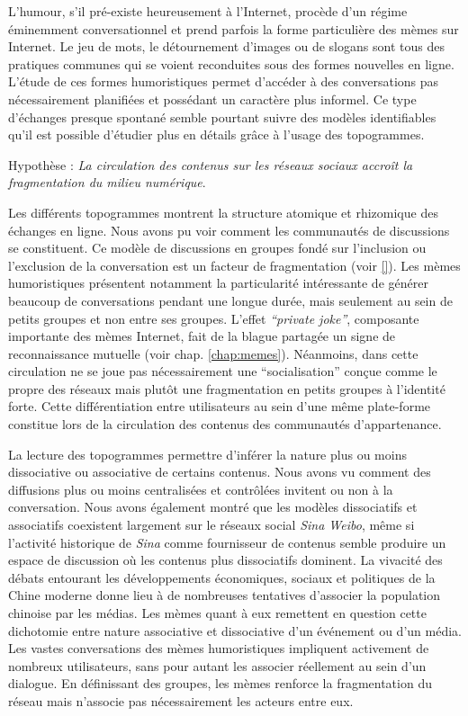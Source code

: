L'humour, s'il pré-existe heureusement à l'Internet, procède d'un régime éminemment conversationnel et prend parfois la forme particulière des mèmes sur Internet. Le jeu de mots, le détournement d'images ou de slogans sont tous des pratiques communes qui se voient reconduites sous des formes nouvelles en ligne. L'étude de ces formes humoristiques permet d'accéder à des conversations pas nécessairement planifiées et possédant un caractère plus informel. Ce type d'échanges presque spontané semble pourtant suivre des modèles identifiables qu'il est possible d'étudier plus en détails grâce à l'usage des topogrammes. 

Hypothèse : \textit{La circulation des contenus sur les réseaux sociaux accroît la fragmentation du milieu numérique}.

Les différents topogrammes montrent la structure atomique et rhizomique des échanges en ligne. Nous avons pu voir comment les communautés de discussions se constituent. Ce modèle de discussions en groupes fondé sur l'inclusion ou l'exclusion de la conversation est un facteur de fragmentation (voir \ref{}). Les mèmes humoristiques présentent notamment la particularité intéressante de générer beaucoup de conversations pendant une longue durée, mais seulement au sein de petits groupes et non entre ses groupes. L'effet \textit{``private joke''}, composante importante des mèmes Internet, fait de la blague partagée un signe de reconnaissance mutuelle (voir chap. \ref{chap:memes}). Néanmoins, dans cette circulation ne se joue pas nécessairement une ``socialisation'' conçue comme le propre des réseaux mais plutôt une fragmentation en petits groupes à l'identité forte. Cette différentiation entre utilisateurs au sein d'une même plate-forme constitue lors de la circulation des contenus des communautés d'appartenance.


La lecture des topogrammes permettre d'inférer la nature plus ou moins dissociative ou associative de certains contenus. Nous avons vu comment des diffusions plus ou moins centralisées et contrôlées invitent ou non à la conversation. Nous avons également montré que les modèles dissociatifs et associatifs coexistent largement sur le réseaux social \textit{Sina Weibo}, même si l'activité historique de \textit{Sina} comme fournisseur de contenus semble produire un espace de discussion où les contenus plus dissociatifs dominent. La vivacité des débats entourant les développements économiques, sociaux et politiques de la Chine moderne donne lieu à de nombreuses tentatives d{\textquoteright}associer la population chinoise par les médias. Les mèmes quant à eux remettent en question cette dichotomie entre nature associative et dissociative d'un événement ou d'un média. Les vastes conversations des mèmes humoristiques impliquent activement de nombreux utilisateurs, sans pour autant les associer réellement au sein d'un dialogue. En définissant des groupes, les mèmes renforce la fragmentation du réseau mais n'associe pas nécessairement les acteurs entre eux.

